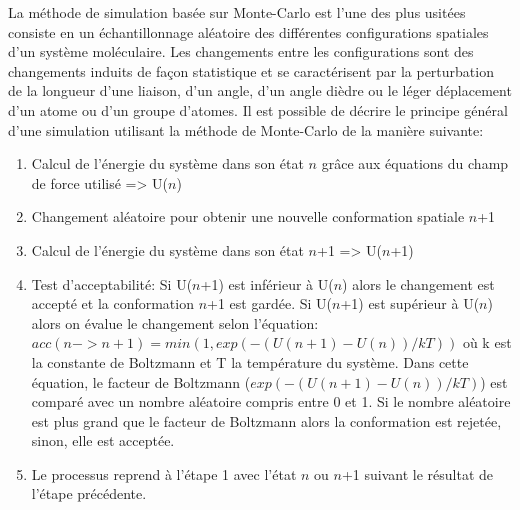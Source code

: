 
La méthode de simulation basée sur Monte-Carlo est l'une des plus usitées \cite{metropolis1949monte} consiste en un échantillonnage aléatoire des différentes configurations spatiales d'un système moléculaire. Les changements entre les configurations sont des changements induits de façon statistique et se caractérisent par la perturbation de la longueur d'une liaison, d'un angle, d'un angle dièdre ou le léger déplacement d'un atome ou d'un groupe d'atomes. 
Il est possible de décrire le principe général d'une simulation utilisant la méthode de Monte-Carlo de la manière suivante:

\begin{enumerate}
  \item Calcul de l'énergie du système dans son état $n$ grâce aux équations du champ de force utilisé => U($n$)
  \item Changement aléatoire pour obtenir une nouvelle conformation spatiale $n$+1
  \item Calcul de l'énergie du système dans son état $n$+1 => U($n$+1)
  \item Test d'acceptabilité: 
  Si U($n$+1) est inférieur à U($n$) alors le changement est accepté et la conformation $n$+1 est gardée. 
  Si U($n$+1) est supérieur à U($n$) alors on évalue le changement selon l'équation: $acc(n -> n+1) = min(1, exp(-(U(n+1)-U(n))/kT))$ où k est la constante de Boltzmann et T la température du système. Dans cette équation, le facteur de Boltzmann ($exp(-(U(n+1)-U(n))/kT)$) est comparé avec un nombre aléatoire compris entre 0 et 1. Si le nombre aléatoire est plus grand que le facteur de Boltzmann alors la conformation est rejetée, sinon, elle est acceptée.
  \item Le processus reprend à l'étape 1 avec l'état $n$ ou $n$+1 suivant le résultat de l'étape précédente.
\end{enumerate}





